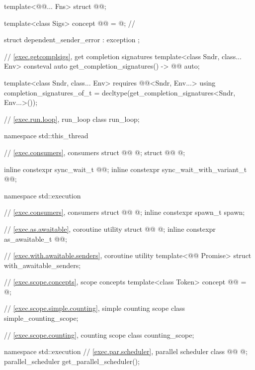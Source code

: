 \begin{codeblock}
{  template<@@... Fns>
    struct @@;

  template<class Sigs>
    concept @@ = @\seebelownc@;            // \expos

  struct dependent_sender_error : exception {};

  // \ref{exec.getcomplsigs}, get completion signatures
  template<class Sndr, class... Env>
    consteval auto get_completion_signatures() -> @@ auto;

  template<class Sndr, class... Env>
      requires @@<Sndr, Env...>
    using completion_signatures_of_t = decltype(get_completion_signatures<Sndr, Env...>());

  // \ref{exec.run.loop}, run_loop
  class run_loop;
}

namespace std::this_thread {
  // \ref{exec.consumers}, consumers
  struct @@ { @\unspec@ };
  struct @@ { @\unspec@ };

  inline constexpr sync_wait_t @@{};
  inline constexpr sync_wait_with_variant_t @@{};
}

namespace std::execution {
  // \ref{exec.consumers}, consumers
  struct @@ { @\unspec@ };
  inline constexpr spawn_t spawn{};

  // \ref{exec.as.awaitable}, coroutine utility 
  struct @@ { @\unspec@ };
  inline constexpr as_awaitable_t @@{};

  // \ref{exec.with.awaitable.senders}, coroutine utility 
  template<@@ Promise>
    struct with_awaitable_senders;

  // \ref{exec.scope.concepts}, scope concepts
  template<class Token>
    concept @@ = @\seebelow@;

  // \ref{exec.scope.simple.counting}, simple counting scope
  class simple_counting_scope;

  // \ref{exec.scope.counting}, counting scope
  class counting_scope;
}

namespace std::execution {
  // \ref{exec.par.scheduler}, parallel scheduler
  class @@ { @\unspec@ };
  parallel_scheduler get_parallel_scheduler();
}


\end{codeblock}
